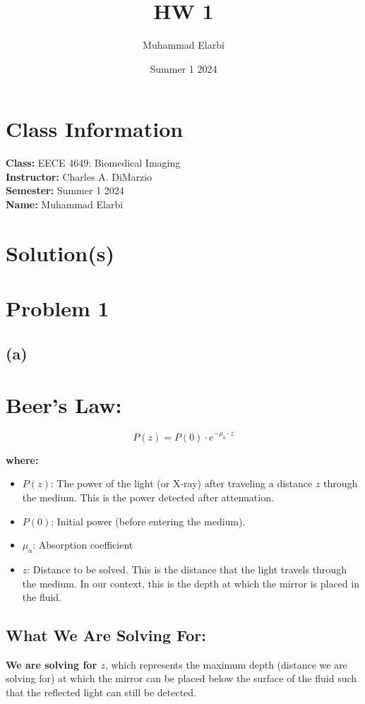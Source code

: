 \documentclass[12pt]{article}
\begin{document}

\title{HW 1}
\author{Muhammad Elarbi}
\date{Summer 1 2024}
\maketitle

\section*{Class Information}
\textbf{Class:} EECE 4649: Biomedical Imaging \\
\textbf{Instructor:} Charles A. DiMarzio \\
\textbf{Semester:} Summer 1 2024 \\
\textbf{Name:} Muhammad Elarbi

\newpage
\section*{Solution(s)}
\section*{Problem 1}
\subsection*{(a)}
\section*{Beer's Law:}

\[ P(z) = P(0) \cdot e^{-\mu_a \cdot z} \]

\textbf{where:}
\begin{itemize}
    \item \( P(z) \): The power of the light (or X-ray) after traveling a distance \( z \) through the medium. This is the power detected after attenuation.
    \item \( P(0) \): Initial power (before entering the medium).
    \item \( \mu_a \): Absorption coefficient
    \item \( z \): Distance to be solved. This is the distance that the light travels through the medium. In our context, this is the depth at which the mirror is placed in the fluid.
\end{itemize}

\subsection*{What We Are Solving For:}
\textbf{We are solving for \( z \)}, which represents the maximum depth (distance we are solving for) at which the mirror can be placed below the surface of the fluid such that the reflected light can still be detected.
\end{document}
